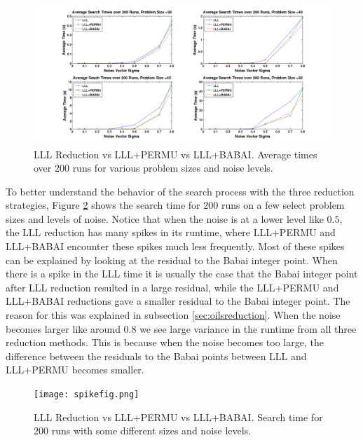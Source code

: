 \documentclass[12pt,Bold,letterpaper]{mcgilletdclass}
\begin{document}
\begin{figure}
\centering
\includegraphics[scale=0.36]{lllvspermuvsbabai.png}
\caption{LLL Reduction vs LLL+PERMU vs LLL+BABAI. Average times over 200 runs for various problem sizes and noise levels.}
\label{fig:LLLvsPermuvsBabai}
\end{figure}

To better understand the behavior of the search process with the three reduction strategies, Figure \ref{fig:spikes} shows the search time for 200 runs on a few select problem sizes and levels of noise. Notice that when the noise is at a lower level like $0.5$, the LLL reduction has many spikes in its runtime, where LLL+PERMU and LLL+BABAI encounter these spikes much less frequently. Most of these spikes can be explained by looking at the residual to the Babai integer point. When there is a spike in the LLL time it is usually the case that the Babai integer point after LLL reduction resulted in a large residual, while the LLL+PERMU and LLL+BABAI reductions gave a smaller residual to the Babai integer point. The reason for this was explained in subsection \ref{sec:oilsreduction}. When the noise becomes larger like around $0.8$ we see large variance in the runtime from all three reduction methods. This is because when the noise becomes too large, the difference between the residuals to the Babai points between LLL and LLL+PERMU becomes smaller.

\begin{figure}
\centering
\texttt{[image: spikefig.png]}
\caption{LLL Reduction vs LLL+PERMU vs LLL+BABAI. Search time for 200 runs with some different sizes and noise levels.}
\label{fig:spikes}
\end{figure}
\end{document}
